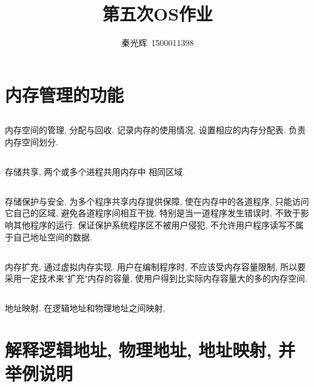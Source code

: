 \documentclass[a4paper, 12pt, notitlepage]{article}
\begin{document}
\title{第五次OS作业}
\author{秦光辉\ 1500011398}
\maketitle

\section{内存管理的功能}

\subsection{}

	内存空间的管理, 分配与回收. 记录内存的使用情况, 设置相应的内存分配表. 负责内存空间划分. \\
	
\subsection{}

	存储共享, 两个或多个进程共用内存中 相同区域. \\

\subsection{}
	
	存储保护与安全. 为多个程序共享内存提供保障, 使在内存中的各道程序, 只能访问它自己的区域, 避免各道程序间相互干拢, 特别是当一道程序发生错误时, 不致于影响其他程序的运行. 保证保护系统程序区不被用户侵犯, 不允许用户程序读写不属于自己地址空间的数据. \\
	
\subsection{}
	
	内存扩充, 通过虚拟内存实现. 用户在编制程序时, 不应该受内存容量限制, 所以要采用一定技术来"扩充"内存的容量, 使用户得到比实际内存容量大的多的内存空间. \\

\subsection{}
	
	地址映射. 在逻辑地址和物理地址之间映射, 
	
\section{解释逻辑地址, 物理地址, 地址映射, 并举例说明}
	
\end{document}
